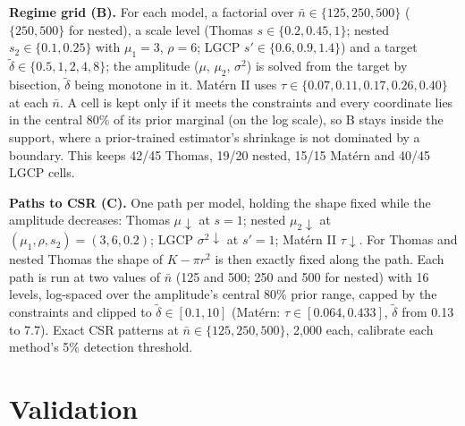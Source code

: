 \documentclass[10pt,a4paper]{article}
\newcommand{\nbar}{\bar n}
\newcommand{\dtil}{\tilde\delta}
\begin{document}
\textbf{Regime grid (B).} For each model, a factorial over $\nbar\in\{125,250,500\}$ ($\{250,500\}$ for nested), a scale level (Thomas $s\in\{0.2,0.45,1\}$; nested $s_2\in\{0.1,0.25\}$ with $\mu_1=3$, $\rho=6$; LGCP $s'\in\{0.6,0.9,1.4\}$) and a target $\dtil\in\{0.5,1,2,4,8\}$; the amplitude ($\mu$, $\mu_2$, $\sigma^2$) is solved from the target by bisection, $\dtil$ being monotone in it. Mat\'ern II uses $\tau\in\{0.07,0.11,0.17,0.26,0.40\}$ at each $\nbar$. A cell is kept only if it meets the constraints and every coordinate lies in the central 80\% of its prior marginal (on the log scale), so B stays inside the support, where a prior-trained estimator's shrinkage is not dominated by a boundary. This keeps 42/45 Thomas, 19/20 nested, 15/15 Mat\'ern and 40/45 LGCP cells.

\textbf{Paths to CSR (C).} One path per model, holding the shape fixed while the amplitude decreases: Thomas $\mu\downarrow$ at $s=1$; nested $\mu_2\downarrow$ at $(\mu_1,\rho,s_2)=(3,6,0.2)$; LGCP $\sigma^2\downarrow$ at $s'=1$; Mat\'ern II $\tau\downarrow$. For Thomas and nested Thomas the shape of $K-\pi r^2$ is then exactly fixed along the path. Each path is run at two values of $\nbar$ (125 and 500; 250 and 500 for nested) with 16 levels, log-spaced over the amplitude's central 80\% prior range, capped by the constraints and clipped to $\dtil\in[0.1,10]$ (Mat\'ern: $\tau\in[0.064,0.433]$, $\dtil$ from 0.13 to 7.7). Exact CSR patterns at $\nbar\in\{125,250,500\}$, 2{,}000 each, calibrate each method's 5\% detection threshold.

\section{Validation}\label{sec:valid}
\end{document}
